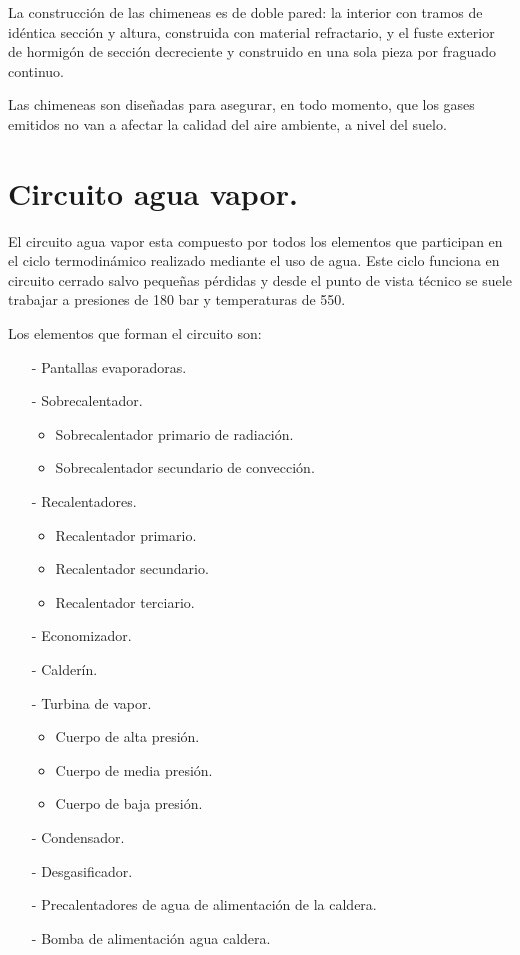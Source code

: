 La construcción de las chimeneas es de doble pared: la interior con tramos de idéntica sección y
altura, construida con material refractario, y el fuste exterior de hormigón de sección decreciente y
construido en una sola pieza por fraguado continuo.



Las chimeneas son diseñadas para asegurar, en todo momento, que los gases emitidos no van a
afectar la calidad del aire ambiente, a nivel del suelo.

\section{Circuito agua vapor.}
El circuito agua vapor esta compuesto por todos los elementos que participan en el ciclo termodinámico realizado mediante el uso de agua. Este ciclo funciona en circuito cerrado salvo pequeñas pérdidas y desde el punto de vista técnico se suele trabajar a presiones de 180 bar y temperaturas de 550\grado.




Los elementos que forman el circuito son:
\begin{itemize}
	\item [-] Pantallas evaporadoras.
 	\item [-] Sobrecalentador.
 	\begin{itemize}
 		\item Sobrecalentador primario de radiación.
 		\item Sobrecalentador secundario de convección.
 	\end{itemize}
	\item [-] Recalentadores.
	\begin{itemize}
		\item Recalentador primario.
		\item Recalentador secundario.
		\item Recalentador terciario.
	\end{itemize}
	\item [-] Economizador.
	\item [-] Calderín.
	\item [-] Turbina de vapor.
	\begin{itemize}
		\item Cuerpo de alta presión.
		\item Cuerpo de media presión.
		\item Cuerpo de baja presión.
	\end{itemize}
	\item [-] Condensador.
	\item [-] Desgasificador.
	\item [-] Precalentadores de agua de alimentación de la caldera.
	\item [-] Bomba de alimentación agua caldera.
\end{itemize}





